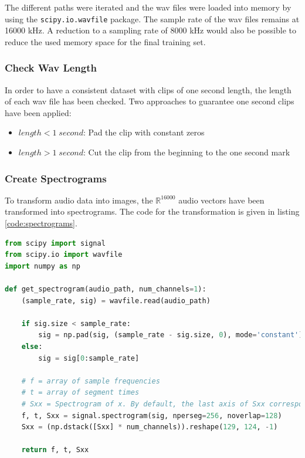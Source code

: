 \documentclass{article}
\theoremstyle{definition}
\theoremstyle{remark}
\begin{document}
The different paths were iterated and the wav files were loaded into memory by using the \texttt{scipy.io.wavfile} package. The sample rate of the wav files remains at 16000 kHz.  A reduction to a sampling rate of 8000 kHz would also be possible to reduce the used memory space for the final training set.


\subsubsection{Check Wav Length}

In order to have a consistent dataset with clips of one second length, the length of each wav file has been checked. Two approaches to guarantee one second clips have been applied:

\begin{itemize}
	\item $length < 1 \; second$: Pad the clip with constant zeros
	\item $length > 1 \; second$: Cut the clip from the beginning to the one second mark
\end{itemize}
 

\subsubsection{Create Spectrograms}

To transform audio data into images, the $\mathbb{R}^{16000}$ audio vectors have been transformed into spectrograms. The code for the transformation is given in listing \ref{code:spectrograms}.



\begin{lstlisting}[language=Python, caption=Get spectrogram code, label=code:spectrograms]
from scipy import signal
from scipy.io import wavfile
import numpy as np

def get_spectrogram(audio_path, num_channels=1):
    (sample_rate, sig) = wavfile.read(audio_path)

    if sig.size < sample_rate:
        sig = np.pad(sig, (sample_rate - sig.size, 0), mode='constant')
    else:
        sig = sig[0:sample_rate]

    # f = array of sample frequencies
    # t = array of segment times
    # Sxx = Spectrogram of x. By default, the last axis of Sxx corresponds to the segment times.
    f, t, Sxx = signal.spectrogram(sig, nperseg=256, noverlap=128)
    Sxx = (np.dstack([Sxx] * num_channels)).reshape(129, 124, -1)

    return f, t, Sxx
\end{lstlisting}
\end{document}
